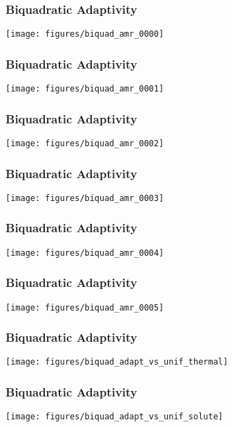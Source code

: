 \begin{frame}
  \frametitle{Biquadratic Adaptivity}
  \begin{center}
	\texttt{[image: figures/biquad\_amr\_0000]}    
  \end{center}
\end{frame}
  
\begin{frame}
  \frametitle{Biquadratic Adaptivity}
  \begin{center}
	\texttt{[image: figures/biquad\_amr\_0001]}    
  \end{center}
\end{frame}

  \begin{frame}
  \frametitle{Biquadratic Adaptivity}
  \begin{center}
	\texttt{[image: figures/biquad\_amr\_0002]}    
  \end{center}
\end{frame}
\begin{frame}
  \frametitle{Biquadratic Adaptivity}
  \begin{center}
	\texttt{[image: figures/biquad\_amr\_0003]}    
  \end{center}
\end{frame}
\begin{frame}
  \frametitle{Biquadratic Adaptivity}
  \begin{center}
	\texttt{[image: figures/biquad\_amr\_0004]}    
  \end{center}
\end{frame}
\begin{frame}
  \frametitle{Biquadratic Adaptivity}
  \begin{center}
	\texttt{[image: figures/biquad\_amr\_0005]}    
  \end{center}
\end{frame}
\begin{frame}
  \frametitle{Biquadratic Adaptivity}
  \begin{center}
	\texttt{[image: figures/biquad\_adapt\_vs\_unif\_thermal]}    
  \end{center}
\end{frame}
\begin{frame}
  \frametitle{Biquadratic Adaptivity}
  \begin{center}
	\texttt{[image: figures/biquad\_adapt\_vs\_unif\_solute]}    
  \end{center}
\end{frame}





